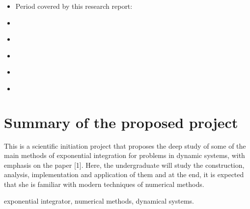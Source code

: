 \documentclass[letterpaper,10pt,english]{jupyterBook}
\begin{document}
\sphinxAtStartPar
{}
\begin{itemize}
\item {} 
\sphinxAtStartPar
Period covered by this research report:

\end{itemize}

\sphinxAtStartPar
{}
\begin{itemize}
\item {} 
\sphinxAtStartPar
{\hyperref[\detokenize{Summary_of_the_proposed_project::doc}]{}}

\item {} 
\sphinxAtStartPar
{\hyperref[\detokenize{Project_execution::doc}]{}}

\item {} 
\sphinxAtStartPar
{\hyperref[\detokenize{References::doc}]{}}

\item {} 
\sphinxAtStartPar
{\hyperref[\detokenize{Participation_in_scientific_event,_list_of_publications_and_list_of_papers_prepared_or_submitted::doc}]{}}

\item {} 
\sphinxAtStartPar
{\hyperref[\detokenize{appendix::doc}]{}}

\end{itemize}

\sphinxstepscope


\chapter{Summary of the proposed project}
\label{\detokenize{Summary_of_the_proposed_project:summary-of-the-proposed-project}}\label{\detokenize{Summary_of_the_proposed_project::doc}}
\sphinxAtStartPar
This is a scientific initiation project that proposes the deep study of some of the main methods
of exponential integration for problems in dynamic systems, with emphasis on the paper {[}1{]}.
Here, the undergraduate will study the construction, analysis, implementation and application
of them and at the end, it is expected that she is familiar with modern techniques of numerical
methods.

\sphinxAtStartPar
{} exponential integrator, numerical methods, dynamical systems.
\end{document}
